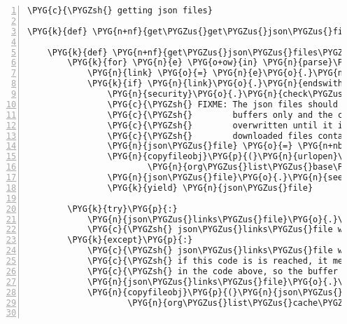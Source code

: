 \begin{Verbatim}[commandchars=\\\{\},numbers=left,firstnumber=1,stepnumber=5]
\PYG{c}{\PYGZsh{} getting json files}

\PYG{k}{def} \PYG{n+nf}{get\PYGZus{}get\PYGZus{}json\PYGZus{}files\PYGZus{}web}\PYG{p}{(}\PYG{n}{json\PYGZus{}links\PYGZus{}file}\PYG{p}{)}\PYG{p}{:}

    \PYG{k}{def} \PYG{n+nf}{get\PYGZus{}json\PYGZus{}files\PYGZus{}web}\PYG{p}{(}\PYG{p}{)}\PYG{p}{:}
        \PYG{k}{for} \PYG{n}{e} \PYG{o+ow}{in} \PYG{n}{parse}\PYG{p}{(}\PYG{n}{json\PYGZus{}links\PYGZus{}file}\PYG{p}{)}\PYG{o}{.}\PYG{n}{getroot}\PYG{p}{(}\PYG{p}{)}\PYG{o}{.}\PYG{n}{iter}\PYG{p}{(}\PYG{l+s}{"}\PYG{l+s}{a}\PYG{l+s}{"}\PYG{p}{)}\PYG{p}{:}
            \PYG{n}{link} \PYG{o}{=} \PYG{n}{e}\PYG{o}{.}\PYG{n}{attrib}\PYG{p}{[}\PYG{l+s}{'}\PYG{l+s}{href}\PYG{l+s}{'}\PYG{p}{]}
            \PYG{k}{if} \PYG{n}{link}\PYG{o}{.}\PYG{n}{endswith}\PYG{p}{(}\PYG{l+s}{"}\PYG{l+s}{.json}\PYG{l+s}{"}\PYG{p}{)}\PYG{p}{:}
                \PYG{n}{security}\PYG{o}{.}\PYG{n}{check\PYGZus{}valid\PYGZus{}filename}\PYG{p}{(}\PYG{n}{link}\PYG{p}{)}
                \PYG{c}{\PYGZsh{} FIXME: The json files should also be returned as StringIO}
                \PYG{c}{\PYGZsh{}        buffers only and the cache files shouldn't be}
                \PYG{c}{\PYGZsh{}        overwritten until it is certain that the newly}
                \PYG{c}{\PYGZsh{}        downloaded files contain the expected data}
                \PYG{n}{json\PYGZus{}file} \PYG{o}{=} \PYG{n+nb}{open}\PYG{p}{(}\PYG{n}{join}\PYG{p}{(}\PYG{n}{org\PYGZus{}list\PYGZus{}cache\PYGZus{}dir}\PYG{p}{,} \PYG{n}{link}\PYG{p}{)}\PYG{p}{,} \PYG{l+s}{"}\PYG{l+s}{w+}\PYG{l+s}{"}\PYG{p}{)}
                \PYG{n}{copyfileobj}\PYG{p}{(}\PYG{n}{urlopen}\PYG{p}{(}\PYG{n}{urljoin}\PYG{p}{(}
                        \PYG{n}{org\PYGZus{}list\PYGZus{}base\PYGZus{}url}\PYG{p}{,} \PYG{n}{link}\PYG{p}{)}\PYG{p}{)}\PYG{p}{,} \PYG{n}{json\PYGZus{}file}\PYG{p}{)}
                \PYG{n}{json\PYGZus{}file}\PYG{o}{.}\PYG{n}{seek}\PYG{p}{(}\PYG{l+m+mi}{0}\PYG{p}{)}
                \PYG{k}{yield} \PYG{n}{json\PYGZus{}file}

        \PYG{k}{try}\PYG{p}{:}
            \PYG{n}{json\PYGZus{}links\PYGZus{}file}\PYG{o}{.}\PYG{n}{fileno}\PYG{p}{(}\PYG{p}{)}
            \PYG{c}{\PYGZsh{} json\PYGZus{}links\PYGZus{}file was defaults or cached}
        \PYG{k}{except}\PYG{p}{:}
            \PYG{c}{\PYGZsh{} json\PYGZus{}links\PYGZus{}file was a memory buffer - save it because}
            \PYG{c}{\PYGZsh{} if this code is is reached, it means there was no error,}
            \PYG{c}{\PYGZsh{} in the code above, so the buffer likely contains good links}
            \PYG{n}{json\PYGZus{}links\PYGZus{}file}\PYG{o}{.}\PYG{n}{seek}\PYG{p}{(}\PYG{l+m+mi}{0}\PYG{p}{)}
            \PYG{n}{copyfileobj}\PYG{p}{(}\PYG{n}{json\PYGZus{}links\PYGZus{}file}\PYG{p}{,} \PYG{n+nb}{open}\PYG{p}{(}\PYG{n}{join}\PYG{p}{(}
                    \PYG{n}{org\PYGZus{}list\PYGZus{}cache\PYGZus{}dir}\PYG{p}{,} \PYG{n}{json\PYGZus{}links\PYGZus{}file\PYGZus{}name}\PYG{p}{)}\PYG{p}{,} \PYG{l+s}{"}\PYG{l+s}{w}\PYG{l+s}{"}\PYG{p}{)}\PYG{p}{)}


\end{Verbatim}

